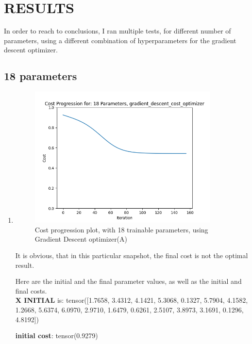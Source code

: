 \documentclass[inscr,ack,preface]{diphdthesis}
\begin{document}
\chapter{RESULTS}

In order to reach to conclusions, I ran multiple tests, for different number of parameters, using a different combination of hyperparameters for the gradient descent optimizer. 

\section{18 parameters}
\begin{enumerate}[label=\textbf{\Alph*.}]
\item \textbf{ }
\begin{figure}[H]
\begin{center}
    \includegraphics[width=0.9\textwidth]{plots/18.png}
    \caption{Cost progression plot, with 18 trainable parameters, using Gradient Descent optimizer(A)} 
    \label{fig:enter-label}
    \end{center}
\end{figure}

It is obvious, that in this particular snapshot, the final cost is not the optimal result.

Here are the initial and the final parameter values, as well as the initial and final costs. \\

\textbf{X INITIAL} is:
 tensor([1.7658, 3.4312, 4.1421, 5.3068, 0.1327, 5.7904, 4.1582, 1.2668, 5.6374,
        6.0970, 2.9710, 1.6479, 0.6261, 2.5107, 3.8973, 3.1691, 0.1296, 4.8192])

\textbf{initial cost}: tensor(0.9279)


\end{enumerate}
\end{document}
